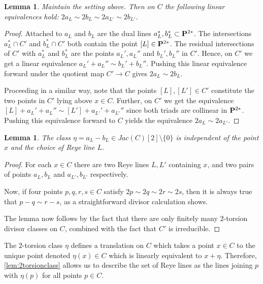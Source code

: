 \documentclass[11pt,reqno]{amsart}
\theoremstyle{plain}
\newtheorem{lemma}[theorem]{Lemma}
\theoremstyle{definition}
\theoremstyle{remark}
\numberwithin{equation}{section}
\renewcommand{\to}{{\longrightarrow}}
\numberwithin{equation}{section}
\begin{document}
\begin{lemma}
  \label{lem:lineEq}
  Maintain the setting above. Then on $C$ the following linear equivalences hold: $2a_{L} \sim 2b_{L} \sim 2a_{L'} \sim 2b_{L'}$.
\end{lemma}

\begin{proof}
  Attached to $a_{L}$ and $b_{L}$ are the dual lines $a_{L}^{*}, b_{L}^{*} \subset \P^{2*}$. The intersections $a_{L}^{*} \cap C'$ and $b_{L}^{*} \cap C'$ both contain the point $[L] \in \P^{2*}$. The residual intersections of $C'$ with $a_{L}^{*}$ and $b_{L}^{*}$ are the points $a_{L}', a_{L}''$ and $b_{L}', b_{L}''$ in $C'$. Hence, on $C'$ we get a linear equivalence $a_{L}'+ a_{L}'' \sim b_{L}' +  b_{L}''$. Pushing this linear equivalence forward under the quotient map $C' \to C$ gives $2a_{L} \sim 2b_{L}$. 

  Proceeding in a similar way, note that the points $[L], [L'] \in C'$ constitute the two points in $C'$ lying above $x \in C$. Further, on $C'$ we get the equivalence $[L] + a_{L}'+ a_{L}'' \sim [L'] + a_{L'}'+ a_{L'}''$ since both triads are collinear in $\P^{2*}$.  Pushing this equivalence forward to $C$ yields the equivalence $2a_{L} \sim 2a_{L'}.$ 
\end{proof}




\begin{lemma}
  \label{lem:2torsionclass}
  The class $\eta = a_{L}-b_{L} \in Jac(C)[2] \setminus \{0\}$ is independent of the point $x$ and the choice of Reye line $L$.
\end{lemma}
\begin{proof}
  For each $x \in C$ there are two Reye lines $L,L'$ containing $x$, and two pairs of points $a_{L},b_{L}$ and $a_{L'},b_{L'}$ respectively. 

  Now, if four points $p,q,r,s \in C$ satisfy $2p \sim 2q \sim 2r \sim 2s$, then it is always true that $p-q 
  \sim r-s$, as a straightforward divisor calculation shows. 

  The lemma now follows by the fact that there are only finitely many $2$-torsion divisor classes on $C$, combined with the fact that $C'$ is irreducible.
\end{proof}


The $2$-torsion class $\eta$ defines a translation on $C$ which takes a point $x \in C$ to the unique point denoted $\eta(x) \in C$ which is linearly equivalent to $x + \eta$. Therefore, \autoref{lem:2torsionclass} allows us to describe the set of Reye lines as the lines joining $p$ with $\eta(p)$ for all points $p \in C$.  
\end{document}
